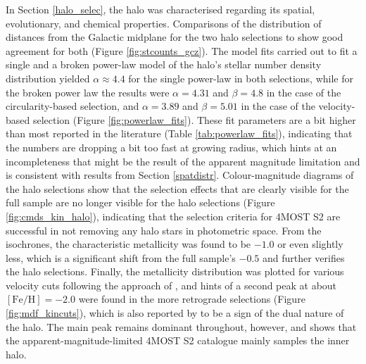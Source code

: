 \documentclass[a4paper,11pt]{article}
\begin{document}
In Section \ref{halo_selec}, the halo was characterised regarding its spatial, evolutionary, and chemical properties. Comparisons of the distribution of distances from the Galactic midplane for the two halo selections to \citet{juric08} show good agreement for both (Figure \ref{fig:stcounts_gcz}). The model fits carried out to fit a single and a broken power-law model of the halo's stellar number density distribution yielded $\alpha\approx4.4$ for the single power-law in both selections, while for the broken power law the results were $\alpha=4.31$ and $\beta=4.8$ in the case of the circularity-based selection, and $\alpha=3.89$ and $\beta=5.01$ in the case of the velocity-based selection (Figure \ref{fig:powerlaw_fits}). These fit parameters are a bit higher than most reported in the literature (Table \ref{tab:powerlaw_fits}), indicating that the numbers are dropping a bit too fast at growing radius, which hints at an incompleteness that might be the result of the apparent magnitude limitation and is consistent with results from Section \ref{spatdistr}. Colour-magnitude diagrams of the halo selections show that the selection effects that are clearly visible for the full sample are no longer visible for the halo selections (Figure \ref{fig:cmds_kin_halo}), indicating that the selection criteria for 4MOST S2 are successful in not removing any halo stars in photometric space. From the isochrones, the characteristic metallicity was found to be $-1.0$ or even slightly less, which is a significant shift from the full sample's $-0.5$ and further verifies the halo selections. Finally, the metallicity distribution was plotted for various velocity cuts following the approach of \citet{carollo07}, and hints of a second peak at about $\mathrm{[Fe/H]}=-2.0$ were found in the more retrograde selections (Figure \ref{fig:mdf_kincuts}), which is also reported by \citet{carollo07} to be a sign of the dual nature of the halo. The main peak remains dominant throughout, however, and shows that the apparent-magnitude-limited 4MOST S2 catalogue mainly samples the inner halo.\\ \\
%
\end{document}
